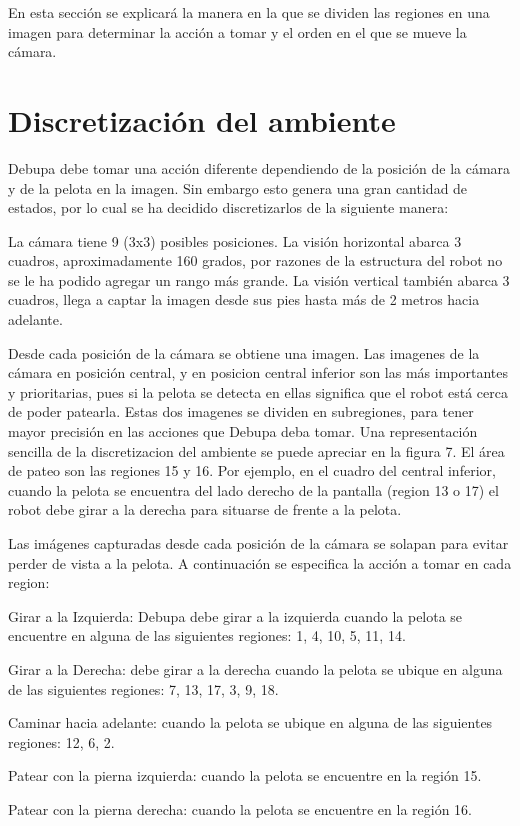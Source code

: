 En esta sección se explicará la manera en la que se dividen las regiones en una imagen para determinar la acción a tomar y el orden en el que se mueve la cámara.

\section{Discretización del ambiente}


Debupa debe tomar una acción diferente dependiendo de la posición de la cámara y de la pelota en la imagen. Sin embargo esto genera una gran cantidad de estados, por lo cual se ha decidido discretizarlos de la siguiente manera:  

La cámara tiene 9 (3x3) posibles posiciones. La visión horizontal abarca 3 cuadros, aproximadamente 160 grados, por razones de la estructura del robot no se le ha podido agregar un rango más grande. La visión vertical también abarca 3 cuadros, llega a captar la imagen desde sus pies hasta más de 2 metros hacia adelante.

Desde cada posición de la cámara se obtiene una imagen. Las imagenes de la cámara en posición central, y en posicion central inferior son las más importantes y prioritarias, pues si la pelota se detecta en ellas significa que el robot está cerca de poder patearla. Estas dos imagenes se dividen en subregiones, para tener mayor precisión en las acciones que Debupa deba tomar. Una representación sencilla de la discretizacion del ambiente se puede apreciar en la figura 7. El área de pateo son las regiones 15 y 16. Por ejemplo, en el cuadro del central inferior, cuando la pelota se encuentra del lado derecho de la pantalla (region 13 o 17) el robot debe girar a la derecha para situarse de frente a la pelota.

Las imágenes capturadas desde cada posición de la cámara se solapan para evitar perder de vista a la pelota. A continuación se especifica la acción a tomar en cada region: 
 
Girar a la Izquierda: Debupa debe girar a la izquierda cuando la pelota se encuentre en alguna de las siguientes regiones: 1, 4, 10, 5, 11, 14.

Girar a la Derecha: debe girar a la derecha cuando la pelota se ubique en alguna de las siguientes regiones: 7, 13, 17, 3, 9, 18. 

Caminar hacia adelante: cuando la pelota se ubique en alguna de las siguientes regiones: 12, 6, 2.

Patear con la pierna izquierda: cuando la pelota se encuentre en la región 15.

Patear con la pierna derecha: cuando la pelota se encuentre en la región 16.

